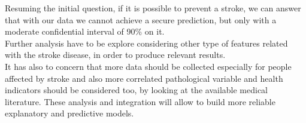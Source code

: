 \documentclass[
]{article}
\begin{document}
Resuming the initial question, if it is possible to prevent a stroke, we
can answer that with our data we cannot achieve a secure prediction, but
only with a moderate confidential interval of 90\% on it.\\
Further analysis have to be explore considering other type of features
related with the stroke disease, in order to produce relevant results.\\
It has also to concern that more data should be collected especially for
people affected by stroke and also more correlated pathological variable
and health indicators should be considered too, by looking at the
available medical literature. These analysis and integration will allow
to build more reliable explanatory and predictive models.
\end{document}
